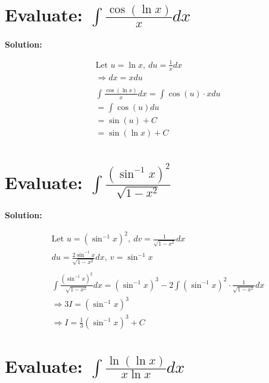 \documentclass{article}
\begin{document}
\newpage

\section{Evaluate: $\int \frac{\cos(\ln x)}{x} dx$}

\textbf{Solution:}

\begin{align*}
     & \text{Let }  u = \ln x, \ du = \frac{1}{x} dx           \\
     & \Rightarrow dx = x du                                   \\
    \\
     & \int \frac{\cos(\ln x)}{x} dx = \int \cos(u) \cdot x du \\
     & = \int \cos(u) du                                       \\
     & = \sin(u) + C                                           \\
     & = {\sin(\ln x) + C}
\end{align*}

\section{Evaluate: $\int \frac{(\sin^{-1} x)^2}{\sqrt{1-x^2}}$}

\textbf{Solution:}

\begin{align*}
     & \text {Let }  u = (\sin^{-1} x)^2, \ dv = \frac{1}{\sqrt{1 - x^2}} dx                                                       \\
     & du = \frac{2\sin^{-1} x}{\sqrt{1 - x^2}} dx, \ v = \sin^{-1} x                                                              \\
    \\
     & \int \frac{(\sin^{-1} x)^2}{\sqrt{1 - x^2}} dx = (\sin^{-1} x)^3 - 2 \int (\sin^{-1} x)^2 \cdot \frac{1}{\sqrt{1 - x^2}} dx \\
     & \Rightarrow 3I = (\sin^{-1} x)^3                                                                                            \\
     & \Rightarrow I = {\frac{1}{3} (\sin^{-1} x)^3 + C}
\end{align*}

\newpage

\section{Evaluate: $\int \frac{\ln(\ln x)}{x \ln x} dx$}
\end{document}
